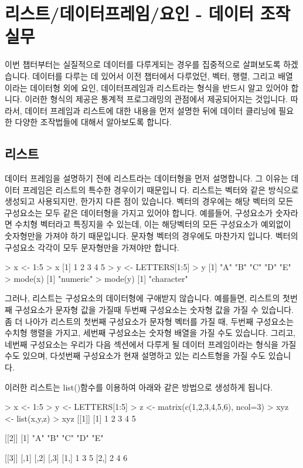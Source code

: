 \documentclass[tutorial.tex]{subfiles}
\begin{document}
\chapter{리스트/데이터프레임/요인 - 데이터 조작실무}

이번 챕터부터는 실질적으로 데이터를 다루게되는 경우를 집중적으로 살펴보도록 하겠습니다.
데이터를 다루는 데 있어서 이전 챕터에서 다루었던, 벡터, 행렬, 그리고 배열이라는 데이터형 외에 요인, 데이터프레임과 리스트라는 형식을 반드시 알고 있어야 합니다.
이러한 형식의 제공은 통계적 프로그래밍의 관점에서 제공되어지는 것입니다. 
따라서, 데이터 프레임과 리스트에 대한 내용을 먼저 설명한 뒤에 데이터 클리닝에 필요한 다양한 조작법들에 대해서 알아보도록 합니다.

\section{리스트}
데이터 프레임을 설명하기 전에 리스트라는 데이터형을 먼저 설명합니다.
그 이유는 데이터 프레임은 리스트의 특수한 경우이기 때문입니
다.
리스트는 벡터와 같은 방식으로 생성되고 사용되지만, 한가지 다른 점이 있습니다.
벡터의 경우에는 해당 벡터의 모든 구성요소는 모두 같은 데이터형을 가지고 있어야 합니다.
예를들어, 구성요소가 숫자라면 수치형 벡터라고 특징지을 수 있는데, 이는 해당벡터의 모든 구성요소가 예외없이 숫자형만을 가져야 하기 때문입니다.
문자형 벡터의 경우에도 마찬가지 입니다. 
벡터의 구성요소 각각이 모두 문자형만을 가져야만 합니다.
\begin{Schunk}
\begin{Soutput}
> x <- 1:5
> x
[1] 1 2 3 4 5
> y <- LETTERS[1:5]
> y
[1] "A" "B" "C" "D" "E"
> mode(x)
[1] "numeric"
> mode(y)
[1] "character"
\end{Soutput}
\end{Schunk}

그러나, 리스트는 구성요소의 데이터형에 구애받지 않습니다.
예를들면, 리스트의 첫번째 구성요소가 문자형 값을 가질때 두번째 구성요소는 숫자형 값을 가질 수 있습니다.
좀 더 나아가 리스트의 첫번째 구성요소가 문자형 벡터를 가질 때, 두번째 구성요소는 수치형 행렬을 가지고, 세번째 구성요소는 숫자형 배열을 가질 수도 있습니다.
그리고, 네번째 구성요소는 우리가 다음 섹션에서 다루게 될 데이터 프레임이라는 형식을 가질 수도 있으며, 다섯번째 구성요소가 현재 설명하고 있는 리스트형을 가질 수도 있습니다.

이러한 리스트는 list()함수를 이용하여 아래와 같은 방법으로 생성하게 됩니다.

\begin{Schunk}
\begin{Soutput}
> x <- 1:5
> y <- LETTERS[1:5]
> z <- matrix(c(1,2,3,4,5,6), ncol=3)
> xyz <- list(x,y,z)
> xyz
[[1]]
[1] 1 2 3 4 5

[[2]]
[1] "A" "B" "C" "D" "E"

[[3]]
     [,1] [,2] [,3]
[1,]    1    3    5
[2,]    2    4    6
 
\end{Soutput}
\end{Schunk}
\end{document}
